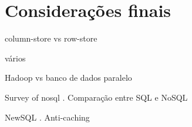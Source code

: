 \section{Considerações finais}

column-store vs row-store \cite{Abadi2008}

vários \cite{Pavlo2009}

Hadoop vs banco de dados paralelo \cite{Stonebraker2010}

Survey of nosql \cite{han2011survey}. Comparação entre SQL e NoSQL 
\cite{cattell2011scalable, stonebraker2010sql}

NewSQL \cite{stonebraker2012newsql}. Anti-caching \cite{debrabant2013anti}
